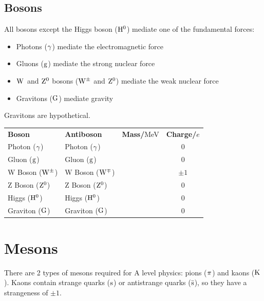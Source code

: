     \subsection{Bosons}
        All bosons except the Higgs boson ($\higgsboson$) mediate one of the fundamental forces:
        \begin{itemize}
            \item Photons ($\photon$) mediate the electromagnetic force
            \item Gluons ($\gluon$) mediate the strong nuclear force
            \item $\wboson[]$ and $\zboson$ bosons ($\wboson[\pm]$ and $\zboson$) mediate the weak nuclear force
            \item Gravitons ($\graviton$) mediate gravity
        \end{itemize}
        
        Gravitons are hypothetical. \\

        \begin{center}
        \begin{tabular}{l l c c}
            \textbf{Boson}           & \textbf{Antiboson}       & \textbf{Mass/}MeV & \textbf{Charge/}$e$ \\
            Photon ($\photon$)       & Photon ($\photon$)       &                   & 0                   \\
            Gluon ($\gluon$)         & Gluon ($\gluon$)         &                   & 0                   \\
            W Boson ($\wboson[\pm]$) & W Boson ($\wboson[\mp]$) &                   & $\pm1$              \\
            Z Boson ($\zboson$)      & Z Boson ($\zboson$)      &                   & 0                   \\
            Higgs ($\higgsboson$)    & Higgs ($\higgsboson$)    &                   & 0                   \\
            Graviton ($\graviton$)   & Graviton ($\graviton$)   &                   & 0
        \end{tabular}
        \end{center}

    \newpage

\section{Mesons} \label{zoo:mesons}
    There are 2 types of mesons required for A level physics: pions ($\pion$) and kaons ($\kaon$).
    Kaons contain strange quarks ($\strangequark$) or antistrange quarks ($\strangeantiquark$), so they have a strangeness of $\pm1$. \\

